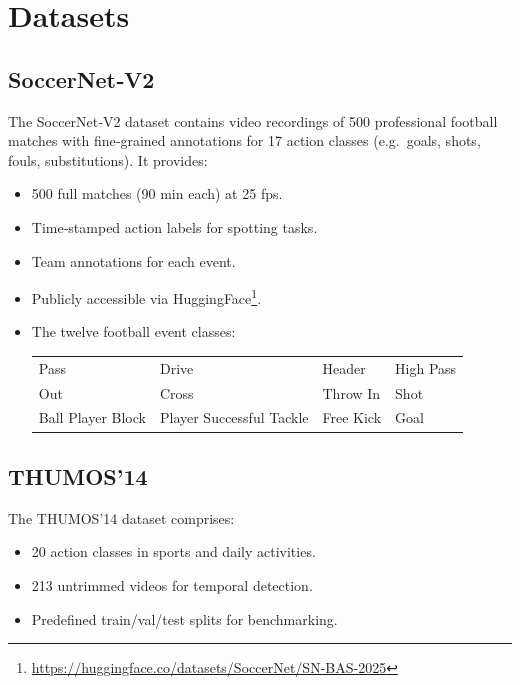 \section{Datasets}
\label{sec:datasets}


\subsection{SoccerNet‑V2}
\label{ssec:soccernet}

The SoccerNet‑V2 dataset \cite{deliege_soccernet-v2_dataset_2021} contains video recordings of 500 professional football matches with fine‑grained annotations for 17 action classes (e.g.\ goals, shots, fouls, substitutions). It provides:
\begin{itemize}
    \item 500 full matches (90 min each) at 25 fps.
    \item Time‑stamped action labels for spotting tasks.
    \item Team annotations for each event.
    \item Publicly accessible via HuggingFace\footnote{\url{https://huggingface.co/datasets/SoccerNet/SN-BAS-2025}}.
    \item The twelve football event classes:
        \begin{center}
            \begin{tabular}{llll}
                Pass & Drive & Header & High Pass \\
                Out & Cross & Throw In & Shot \\
                Ball Player Block & Player Successful Tackle & Free Kick & Goal
            \end{tabular}
        \end{center}
\end{itemize}


\subsection{THUMOS'14}
\label{ssec:thumos}

The THUMOS'14 dataset \cite{dataset:thumos} comprises:
\begin{itemize}
    \item 20 action classes in sports and daily activities.
    \item 213 untrimmed videos for temporal detection.
    \item Predefined train/val/test splits for benchmarking.
\end{itemize}

